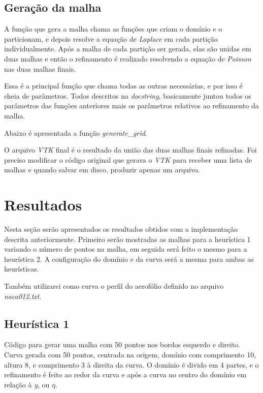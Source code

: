 \documentclass[a4paper]{article}
\begin{document}


\subsection{Geração da malha}

A função que gera a malha chama as funções que criam o domínio e o particionam, e depois resolve a equação de \textit{Laplace} em cada partição individualmente. Após a malha de cada partição ser gerada, elas são unidas em duas malhas e então o refinamento é realizado resolvendo a equação de \textit{Poisson} nas duas malhas finais. 

Essa é a principal função que chama todas as outras necessárias, e por isso é cheia de parâmetros. Todos descritos na \textit{docstring}, basicamente juntou todos os parâmetros das funções anteriores mais os parâmetros relativos ao refinamento da malha.

Abaixo é apresentada a função \textit{generate\_grid}.


O arquivo \textit{VTK} final é o resultado da união das duas malhas finais refinadas. Foi preciso modificar o código original que gerava o \textit{VTK} para receber uma lista de malhas e quando salvar em disco, produzir apenas um arquivo.


\section{Resultados}


Nesta seção serão apresentados os resultados obtidos com a implementação descrita anteriormente. Primeiro serão mostradas as malhas para a heurística 1 variando o número de pontos na malha, em seguida será feito o mesmo para a heurística 2.
A configuração do domínio e da curva será a mesma para ambas as heurísticas.

Também utilizarei como curva o perfil do aerofólio definido no arquivo \textit{naca012.txt}.



\subsection{Heurística 1}

Código para gerar uma malha com 50 pontos nos bordos esquerdo e direito. Curva gerada com 50 pontos, centrada na origem, domínio com comprimento 10, altura 8, e comprimento 3 à direita da curva. O domínio é divido em 4 partes, e o refinamento é feito ao redor da curva e após a curva no centro do domínio em relação à \textit{y}, ou $\eta$.
\end{document}
